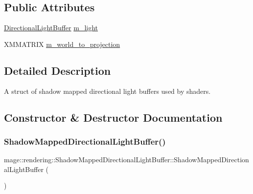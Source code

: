 \subsection*{Public Attributes}
\begin{DoxyCompactItemize}
\item 
\mbox{\hyperlink{structmage_1_1rendering_1_1_directional_light_buffer}{Directional\+Light\+Buffer}} \mbox{\hyperlink{structmage_1_1rendering_1_1_shadow_mapped_directional_light_buffer_a3aa791aa543feb7a92a42251ea6b655e}{m\+\_\+light}}
\item 
X\+M\+M\+A\+T\+R\+IX \mbox{\hyperlink{structmage_1_1rendering_1_1_shadow_mapped_directional_light_buffer_a293c5a1f5ce4a21b713df0ea9a088750}{m\+\_\+world\+\_\+to\+\_\+projection}}
\end{DoxyCompactItemize}


\subsection{Detailed Description}
A struct of shadow mapped directional light buffers used by shaders. 

\subsection{Constructor \& Destructor Documentation}
\mbox{\label{structmage_1_1rendering_1_1_shadow_mapped_directional_light_buffer_ad3467d873a7c1b756df37458b49bf43f}} 
\subsubsection{\texorpdfstring{Shadow\+Mapped\+Directional\+Light\+Buffer()}{ShadowMappedDirectionalLightBuffer()}\hspace{0.1cm}{\footnotesize\ttfamily [1/3]}}
{\footnotesize\ttfamily mage\+::rendering\+::\+Shadow\+Mapped\+Directional\+Light\+Buffer\+::\+Shadow\+Mapped\+Directional\+Light\+Buffer (\begin{DoxyParamCaption}{ }\end{DoxyParamCaption})\hspace{0.3cm}{\ttfamily [noexcept]}}

